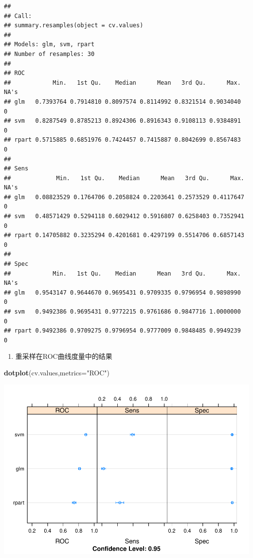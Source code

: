 \documentclass[
]{article}
\newenvironment{Shaded}{\begin{snugshade}}{\end{snugshade}}
\newcommand{\DataTypeTok}[1]{\textcolor[rgb]{0.13,0.29,0.53}{#1}}
\newcommand{\KeywordTok}[1]{\textcolor[rgb]{0.13,0.29,0.53}{\textbf{#1}}}
\newcommand{\NormalTok}[1]{#1}
\newcommand{\StringTok}[1]{\textcolor[rgb]{0.31,0.60,0.02}{#1}}
\providecommand{\tightlist}{%
  \setlength{\itemsep}{0pt}\setlength{\parskip}{0pt}}
\begin{document}
\begin{verbatim}
## 
## Call:
## summary.resamples(object = cv.values)
## 
## Models: glm, svm, rpart 
## Number of resamples: 30 
## 
## ROC 
##            Min.   1st Qu.    Median      Mean   3rd Qu.      Max. NA's
## glm   0.7393764 0.7914810 0.8097574 0.8114992 0.8321514 0.9034040    0
## svm   0.8287549 0.8785213 0.8924306 0.8916343 0.9108113 0.9384891    0
## rpart 0.5715885 0.6851976 0.7424457 0.7415887 0.8042699 0.8567483    0
## 
## Sens 
##             Min.   1st Qu.    Median      Mean   3rd Qu.      Max. NA's
## glm   0.08823529 0.1764706 0.2058824 0.2203641 0.2573529 0.4117647    0
## svm   0.48571429 0.5294118 0.6029412 0.5916807 0.6258403 0.7352941    0
## rpart 0.14705882 0.3235294 0.4201681 0.4297199 0.5514706 0.6857143    0
## 
## Spec 
##            Min.   1st Qu.    Median      Mean   3rd Qu.      Max. NA's
## glm   0.9543147 0.9644670 0.9695431 0.9709335 0.9796954 0.9898990    0
## svm   0.9492386 0.9695431 0.9772215 0.9761686 0.9847716 1.0000000    0
## rpart 0.9492386 0.9709275 0.9796954 0.9777009 0.9848485 0.9949239    0
\end{verbatim}

\begin{enumerate}
\def\labelenumi{\arabic{enumi}.}
\setcounter{enumi}{2}
\tightlist
\item
  重采样在ROC曲线度量中的结果
\end{enumerate}

\begin{Shaded}
\begin{Highlighting}[]
\KeywordTok{dotplot}\NormalTok{(cv.values,}\DataTypeTok{metrics=}\StringTok{"ROC"}\NormalTok{)}
\end{Highlighting}
\end{Shaded}

\includegraphics{R_FinalReport_files/figure-latex/unnamed-chunk-50-1.pdf}
\end{document}
